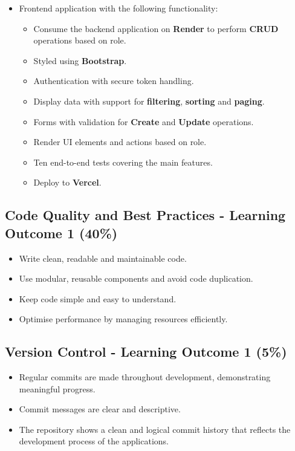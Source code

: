 \documentclass{article}
\begin{document}
\begin{itemize}
	 \item Frontend application with the following functionality:
	 \begin{itemize}
		 \item Consume the backend application on \textbf{Render} to perform \textbf{CRUD} operations based on role.
         \item Styled using \textbf{Bootstrap}.
		 \item Authentication with secure token handling.
		 \item Display data with support for \textbf{filtering}, \textbf{sorting} and \textbf{paging}.
		 \item Forms with validation for \textbf{Create} and \textbf{Update} operations.
		 \item Render UI elements and actions based on role.
		 \item Ten end-to-end tests covering the main features.
		 \item Deploy to \textbf{Vercel}.
	 \end{itemize}
\end{itemize}

\subsection*{Code Quality and Best Practices - Learning Outcome 1 (40\%)}
\begin{itemize}
	\item Write clean, readable and maintainable code.
	\item Use modular, reusable components and avoid code duplication.
	\item Keep code simple and easy to understand.
	\item Optimise performance by managing resources efficiently.
\end{itemize}

\subsection*{Version Control - Learning Outcome 1 (5\%)}
\begin{itemize}
  \item Regular commits are made throughout development, demonstrating meaningful progress.
  \item Commit messages are clear and descriptive.
  \item The repository shows a clean and logical commit history that reflects the development process of the applications.
\end{itemize} 
\end{document}
